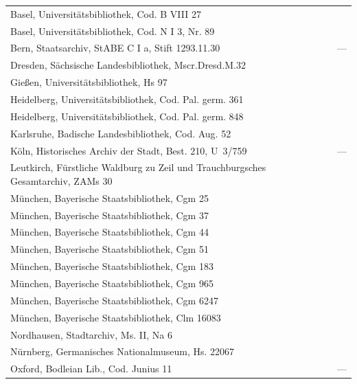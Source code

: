 \noindent
\begin{tabularx}{\linewidth}{@{} >{\raggedright\arraybackslash}X l @{}}
Basel, Universitätsbibliothek, Cod. B VIII 27
	& \autocite[2776]{hsc} \\
Basel, Universitätsbibliothek, Cod. N I 3, Nr. 89
	& \autocite[1158]{hsc} \\
Bern, Staatsarchiv, StABE C I a, Stift 1293.11.30
	& --- \\
Dresden, Sächsische Landesbibliothek, Mscr.Dresd.M.32
	& \autocite[7549]{hsc} \\
Gießen, Universitätsbibliothek, Hs 97
	& \autocite[1102]{hsc} \\
Heidelberg, Universitätsbibliothek, Cod. Pal. germ. 361
	& \autocite[1181]{hsc} \\
Heidelberg, Universitätsbibliothek, Cod. Pal. germ. 848
	& \autocite[4957]{hsc} \\
Karlsruhe, Badische Landesbibliothek, Cod. Aug. 52
	& \autocite[8470]{hsc} \\
Köln, Historisches Archiv der Stadt, Best. 210, U~3/759
	& ---%
	\\
Leutkirch, Fürstliche Waldburg zu Zeil und Trauch\-burg\-sches
	Gesamt\-archiv, ZAMs 30
	& \autocite[8471]{hsc} \\
München, Bayerische Staatsbibliothek, Cgm 25
	& \autocite[8827]{hsc} \\
München, Bayerische Staatsbibliothek, Cgm 37
	& \autocite[2119]{hsc} \\
München, Bayerische Staatsbibliothek, Cgm 44
	& \autocite[1307]{hsc} \\
München, Bayerische Staatsbibliothek, Cgm 51
	& \autocite[1286]{hsc} \\
München, Bayerische Staatsbibliothek, Cgm 183
	& \autocite[9715]{hsc} \\
München, Bayerische Staatsbibliothek, Cgm 965
	& \autocite[8472]{hsc} \\
München, Bayerische Staatsbibliothek, Cgm 6247
	& \autocite[1450]{hsc} \\
München, Bayerische Staatsbibliothek, Clm 16083
	& \autocite[19293]{hsc} \\
Nordhausen, Stadtarchiv, Ms. II, Na 6
	& \autocite[1379]{hsc} \\
Nürnberg, Germanisches Nationalmuseum, Hs. 22067
	& \autocite[1189]{hsc} \\
Oxford, Bodleian Lib., Cod. Junius 11
	& ---%
	\\
\end{tabularx}

